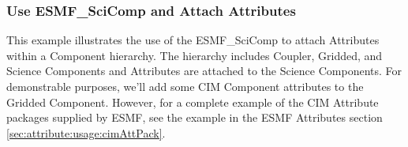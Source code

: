  
\setlength{\oldparskip}{\parskip}
\setlength{\parskip}{1.5ex}
\setlength{\oldparindent}{\parindent}
\setlength{\parindent}{0pt}
\setlength{\oldbaselineskip}{\baselineskip}
\setlength{\baselineskip}{11pt}
 
\def\bv{\begin{verbatim}}
\def\ev{\end{verbatim}}
\def\be{\begin{equation}}
\def\ee{\end{equation}}
\def\bea{\begin{eqnarray}}
\def\eea{\end{eqnarray}}
\def\bi{\begin{itemize}}
\def\ei{\end{itemize}}
\def\bn{\begin{enumerate}}
\def\en{\end{enumerate}}
\def\bd{\begin{description}}
\def\ed{\end{description}}
\def\({\left (}
\def\){\right )}
\def\[{\left [}
\def\]{\right ]}
\def\<{\left  \langle}
\def\>{\right \rangle}
\def\cI{{\cal I}}
\def\diag{\mathop{\rm diag}}
\def\tr{\mathop{\rm tr}}


 

   \subsubsection{Use ESMF\_SciComp and Attach Attributes}
   \label{sec:component:usage:scicomp}
  
  \begin{sloppypar}
   This example illustrates the use of the ESMF\_SciComp to attach Attributes
   within a Component hierarchy.  The hierarchy includes Coupler, Gridded,
   and Science Components and Attributes are attached to the Science Components.
   For demonstrable purposes, we'll add some CIM Component attributes to
   the Gridded Component.  However, for a complete example of the CIM
   Attribute packages supplied by ESMF, see the example in the ESMF Attributes
   section \ref{sec:attribute:usage:cimAttPack}.
  \end{sloppypar} 


